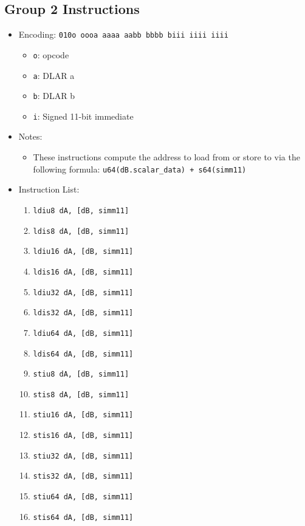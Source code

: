 \documentclass{article}
\begin{document}
	\subsection{Group 2 Instructions}
		\begin{itemize}
		\item Encoding:  \texttt{010o oooa aaaa aabb  bbbb biii iiii iiii}
			\begin{itemize}
			\item \texttt{o}:  opcode
			\item \texttt{a}:  DLAR a
			\item \texttt{b}:  DLAR b
			\item \texttt{i}:  Signed 11-bit immediate
			\end{itemize}
		\item Notes:
			\begin{itemize}
			\item These instructions compute the address to load from or
				store to via the following formula:
				\texttt{u64(dB.scalar\_data) + s64(simm11)}
			\end{itemize}
		\item Instruction List:
			\begin{enumerate}
			\item \texttt{ldiu8 dA, [dB, simm11]}
			\item \texttt{ldis8 dA, [dB, simm11]}
			\item \texttt{ldiu16 dA, [dB, simm11]}
			\item \texttt{ldis16 dA, [dB, simm11]}

			\item \texttt{ldiu32 dA, [dB, simm11]}
			\item \texttt{ldis32 dA, [dB, simm11]}
			\item \texttt{ldiu64 dA, [dB, simm11]}
			\item \texttt{ldis64 dA, [dB, simm11]}

			\item \texttt{stiu8 dA, [dB, simm11]}
			\item \texttt{stis8 dA, [dB, simm11]}
			\item \texttt{stiu16 dA, [dB, simm11]}
			\item \texttt{stis16 dA, [dB, simm11]}

			\item \texttt{stiu32 dA, [dB, simm11]}
			\item \texttt{stis32 dA, [dB, simm11]}
			\item \texttt{stiu64 dA, [dB, simm11]}
			\item \texttt{stis64 dA, [dB, simm11]}
			\end{enumerate}
		\end{itemize}
\end{document}
